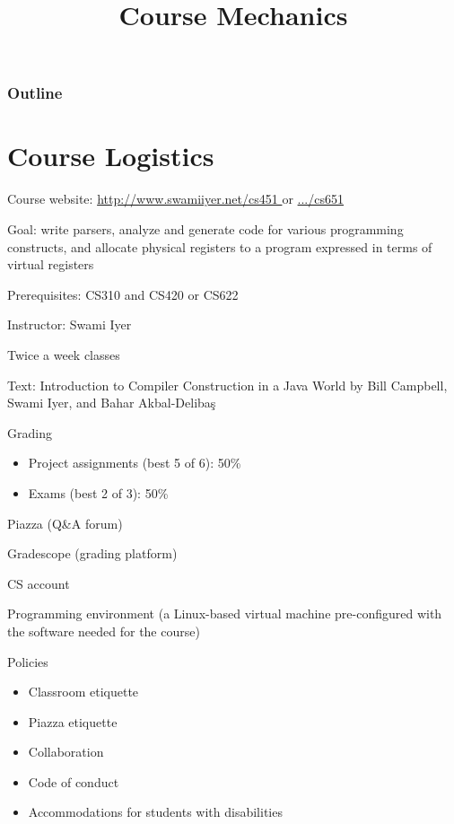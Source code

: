 \documentclass[8pt,a4paper,compress]{beamer}
\title{Course Mechanics}
\date{}
\begin{document}
\begin{frame}
\vfill
\titlepage
\end{frame}

\begin{frame}
\frametitle{Outline}
\tableofcontents
\end{frame}

\section{Course Logistics}
\begin{frame}[fragile]
\pause

Course website: \href{http://www.swamiiyer.net/cs451}{http://www.swamiiyer.net/cs451 \ExternalLink} or \href{http://www.swamiiyer.net/cs651}{.../cs651 \ExternalLink}

\pause
\bigskip

Goal: write parsers, analyze and generate code for various programming constructs, and allocate physical registers to a program expressed in terms of virtual registers

\pause
\bigskip

Prerequisites: CS310 and CS420 or CS622

\pause
\bigskip

Instructor: Swami Iyer

\pause
\bigskip

Twice a week classes

\pause
\bigskip

Text: Introduction to Compiler Construction in a Java World 
by Bill Campbell, Swami Iyer, and Bahar Akbal-Deliba\c{s}
\end{frame}

\begin{frame}[fragile]
\pause

Grading
\begin{itemize}
\item Project assignments (best 5 of 6): 50\%
\item Exams (best 2 of 3): 50\%
\end{itemize}

\pause
\bigskip

Piazza (Q\&A forum)

\pause
\bigskip

Gradescope (grading platform)

\pause
\bigskip

CS account

\pause
\bigskip

Programming environment (a Linux-based virtual machine pre-configured with the software needed for the course)

\pause
\bigskip

Policies
\begin{itemize}
\item Classroom etiquette
\item Piazza etiquette
\item Collaboration
\item Code of conduct
\item Accommodations for students with disabilities
\end{itemize}
\end{frame}
\end{document}
